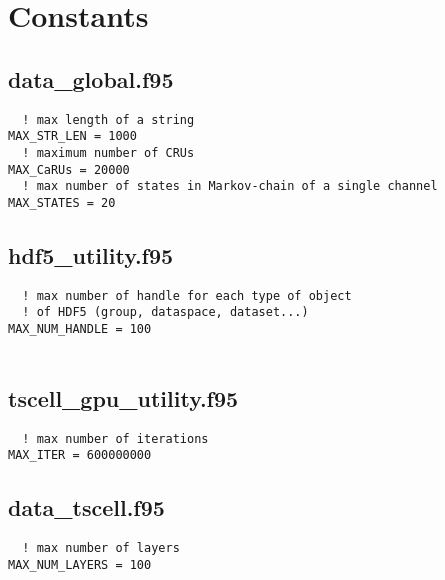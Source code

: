 \chapter{Constants}
\label{chap:constants}

\section{data\_global.f95}	

\begin{verbatim}
  ! max length of a string
MAX_STR_LEN = 1000
  ! maximum number of CRUs
MAX_CaRUs = 20000
  ! max number of states in Markov-chain of a single channel
MAX_STATES = 20

\end{verbatim}

\section{hdf5\_utility.f95}

\begin{verbatim}
  ! max number of handle for each type of object 
  ! of HDF5 (group, dataspace, dataset...)
MAX_NUM_HANDLE = 100


\end{verbatim}

\section{tscell\_gpu\_utility.f95}

\begin{verbatim}
  ! max number of iterations
MAX_ITER = 600000000
\end{verbatim}

\section{data\_tscell.f95}

\begin{verbatim}
  ! max number of layers
MAX_NUM_LAYERS = 100
\end{verbatim}